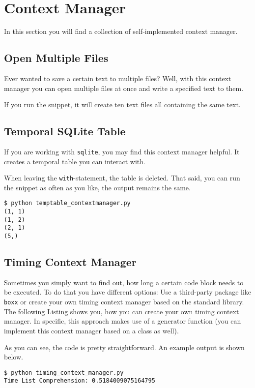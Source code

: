 
\section{Context Manager}

In this section you will find a collection of self-implemented context manager.


\subsection{Open Multiple Files}

Ever wanted to save a certain text to multiple files?
Well, with this context manager you can open multiple files at once and write a specified text to them.



If you run the snippet, it will create ten text files all containing the same text.


\subsection{Temporal SQLite Table}

If you are working with \lstinline{sqlite}, you may find this context manager helpful.
It creates a temporal table you can interact with.



When leaving the \lstinline{with}-statement, the table is deleted.
That said, you can run the snippet as often as you like, the output remains the same.

\begin{lstlisting}[caption=Output of temptable\_contextmanager.py]
$ python temptable_contextmanager.py
(1, 1)
(1, 2)
(2, 1)
(5,)
\end{lstlisting}


\subsection{Timing Context Manager}

Sometimes you simply want to find out, how long a certain code block needs to be executed.
To do that you have different options: Use a third-party package like \lstinline{boxx} or create your own timing context manager based on the standard library.
The following Listing shows you, how you can create your own timing context manager.
In specific, this approach makes use of a generator function (you can implement this context manager based on a class as well).



As you can see, the code is pretty straightforward.
An example output is shown below.

\begin{lstlisting}[caption=Output of timing\_context\_manager.py]
$ python timing_context_manager.py
Time List Comprehension: 0.5184009075164795
\end{lstlisting}
